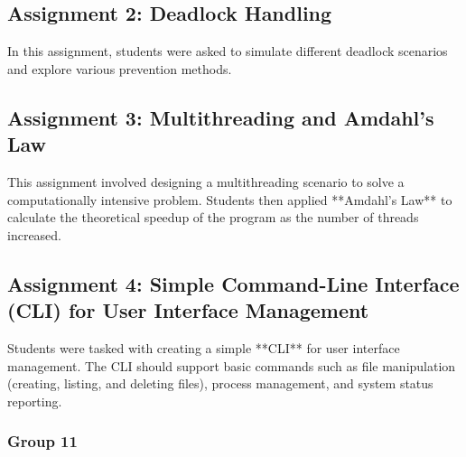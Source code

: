 \documentclass[12pt]{article}
\begin{document}
\subsection{Assignment 2: Deadlock Handling}
In this assignment, students were asked to simulate different deadlock scenarios and explore various prevention methods.

\subsection{Assignment 3: Multithreading and Amdahl's Law}
This assignment involved designing a multithreading scenario to solve a computationally intensive problem. Students then applied **Amdahl's Law** to calculate the theoretical speedup of the program as the number of threads increased.

\subsection{Assignment 4: Simple Command-Line Interface (CLI) for User Interface Management}
Students were tasked with creating a simple **CLI** for user interface management. The CLI should support basic commands such as file manipulation (creating, listing, and deleting files), process management, and system status reporting.
\subsubsection{Group 11}
\end{document}
